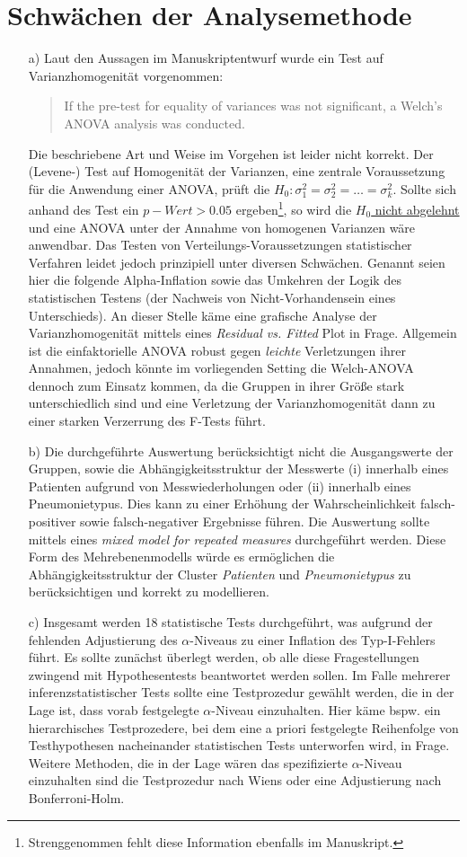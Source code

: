 \documentclass{scrartcl}
\theoremstyle{definition}
\theoremstyle{remark}
\begin{document}
\section{Schwächen der Analysemethode}
\begin{enumerate}
	\item[a) ]Laut den Aussagen im Manuskriptentwurf wurde ein Test auf Varianzhomogenität vorgenommen: 
	\begin{quotation}
		If the pre-test for equality of variances was not significant, a Welch's ANOVA analysis was conducted.
	\end{quotation}
	Die beschriebene Art und Weise im Vorgehen ist leider nicht korrekt. Der (Levene-) Test auf Homogenität der Varianzen, eine zentrale Voraussetzung für die Anwendung einer ANOVA, prüft die $H_0: \sigma^{2}_{1} = \sigma^{2}_{2} = \dots = \sigma^{2}_k$. Sollte sich anhand des Test ein $p-Wert>0.05$ ergeben\footnote{Strenggenommen fehlt diese Information ebenfalls im Manuskript.}, so wird die \underline{$H_0$ nicht abgelehnt} und eine ANOVA unter der Annahme von homogenen Varianzen wäre anwendbar. Das Testen von Verteilungs-Voraussetzungen statistischer Verfahren leidet jedoch prinzipiell unter diversen Schwächen. Genannt seien hier die folgende Alpha-Inflation sowie das Umkehren der Logik des statistischen Testens (der Nachweis von Nicht-Vorhandensein eines Unterschieds). An dieser Stelle käme eine grafische Analyse der Varianzhomogenität mittels eines \textit{Residual vs. Fitted} Plot in Frage. Allgemein ist die einfaktorielle ANOVA  robust gegen \textit{leichte} Verletzungen ihrer Annahmen, jedoch könnte im vorliegenden Setting die Welch-ANOVA  dennoch zum Einsatz kommen, da die Gruppen in ihrer Größe stark unterschiedlich sind und eine Verletzung der Varianzhomogenität dann zu einer starken Verzerrung des F-Tests führt.
	\item[b) ] Die durchgeführte Auswertung berücksichtigt nicht die Ausgangswerte der Gruppen, sowie die Abhängigkeitsstruktur der Messwerte (i) innerhalb eines Patienten aufgrund von Messwiederholungen oder (ii) innerhalb eines Pneumonietypus. Dies kann zu einer Erhöhung der Wahrscheinlichkeit falsch-positiver sowie falsch-negativer Ergebnisse führen. Die Auswertung sollte mittels eines  \textit{mixed model for repeated measures} durchgeführt werden. Diese Form des Mehrebenenmodells würde es ermöglichen die Abhängigkeitsstruktur der Cluster \textit{Patienten} und \textit{Pneumonietypus} zu berücksichtigen und korrekt zu modellieren.
	\item[c) ]Insgesamt werden 18 statistische Tests durchgeführt, was aufgrund der fehlenden Adjustierung des $\alpha$-Niveaus zu einer Inflation des Typ-I-Fehlers führt. Es sollte zunächst überlegt werden, ob alle diese Fragestellungen zwingend mit Hypothesentests beantwortet werden sollen. Im Falle mehrerer inferenzstatistischer Tests sollte eine Testprozedur gewählt werden, die in der Lage ist, dass vorab festgelegte $\alpha$-Niveau einzuhalten. Hier käme bspw. ein hierarchisches Testprozedere, bei dem eine a priori festgelegte Reihenfolge von Testhypothesen nacheinander statistischen Tests unterworfen wird, in Frage. Weitere Methoden, die in der Lage wären das spezifizierte $\alpha$-Niveau einzuhalten sind die Testprozedur nach Wiens oder eine Adjustierung nach Bonferroni-Holm.

\end{enumerate}
\end{document}

